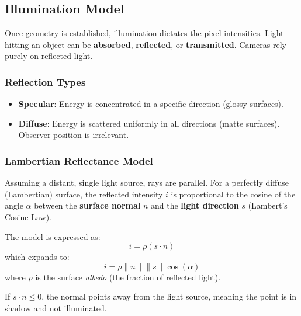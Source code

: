 \subsection{Illumination Model}
Once geometry is established, illumination dictates the pixel intensities. Light hitting an object can be \textbf{absorbed}, \textbf{reflected}, or \textbf{transmitted}. Cameras rely purely on reflected light.

\subsubsection{Reflection Types}
\begin{itemize}
    \item \textbf{Specular}: Energy is concentrated in a specific direction (glossy surfaces).
    \item \textbf{Diffuse}: Energy is scattered uniformly in all directions (matte surfaces). Observer position is irrelevant.
\end{itemize}

\subsubsection{Lambertian Reflectance Model}
Assuming a distant, single light source, rays are parallel. For a perfectly diffuse (Lambertian) surface, the reflected intensity $i$ is proportional to the cosine of the angle $\alpha$ between the \textbf{surface normal} $n$ and the \textbf{light direction} $s$ (Lambert's Cosine Law).

The model is expressed as:
\begin{equation}
    \label{eq:lambertian_reflectance_model}
    i = \rho (s \cdot n)
\end{equation}
which expands to:
\[ i = \rho \|n\| \|s\| \cos(\alpha)\]
where $\rho$ is the surface \textit{albedo} (the fraction of reflected light). 

If $s \cdot n \le 0$, the normal points away from the light source, meaning the point is in shadow and not illuminated.